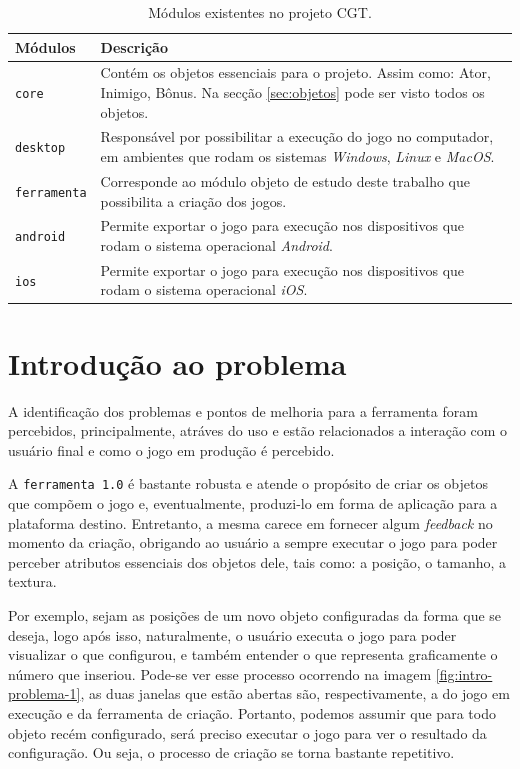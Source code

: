 \documentclass[12pt,twoside,openright,a4paper,english,brazil,sumario=tradicional]{abntex2}
\begin{document}
\begin{table}[h]
\centering
\begin{tabular}{ | l | p{10cm} | }
    \hline
    Módulos & Descrição \\ \hline
    \texttt{core} & Contém os objetos essenciais para o projeto. Assim como: Ator, Inimigo, Bônus. Na secção \ref{sec:objetos} pode ser visto todos os objetos. \\ \hline
    \texttt{desktop} & Responsável por possibilitar a execução do jogo no computador, em ambientes que rodam os sistemas \emph{Windows}, \emph{Linux} e \emph{MacOS}. \\ \hline
		\texttt{ferramenta} & Corresponde ao módulo objeto de estudo deste trabalho que possibilita a criação dos jogos. \\ \hline
		\texttt{android} & Permite exportar o jogo para execução nos dispositivos que rodam o sistema operacional \emph{Android}. \\ \hline
		\texttt{ios} & Permite exportar o jogo para execução nos dispositivos que rodam o sistema operacional \emph{iOS}. \\ \hline
\end{tabular}
\caption{Módulos existentes no projeto CGT.}
\label{table:modulos}
\end{table}

\section{Introdução ao problema}
\label{sec:intro-problema}
A identificação dos problemas e pontos de melhoria para a ferramenta foram percebidos, principalmente, atráves do uso e estão relacionados a interação com o usuário final e como o jogo em produção é percebido.

A \texttt{ferramenta 1.0} é bastante robusta e atende o propósito de criar os objetos que compõem o jogo e, eventualmente, produzi-lo em forma de aplicação para a plataforma destino. Entretanto, a mesma carece em fornecer algum \emph{feedback} no momento da criação, obrigando ao usuário a sempre executar o jogo para poder perceber atributos essenciais dos objetos dele, tais como: a posição, o tamanho, a textura.

Por exemplo, sejam as posições de um novo objeto configuradas da forma que se deseja, logo após isso, naturalmente, o usuário executa o jogo para poder visualizar o que configurou, e também entender o que representa graficamente o número que inseriou. Pode-se ver esse processo ocorrendo na imagem \ref{fig:intro-problema-1}, as duas janelas que estão abertas são, respectivamente, a do jogo em execução e da ferramenta de criação. Portanto, podemos assumir que para todo objeto recém configurado, será preciso executar o jogo para ver o resultado da configuração. Ou seja, o processo de criação se torna bastante repetitivo.
\end{document}
